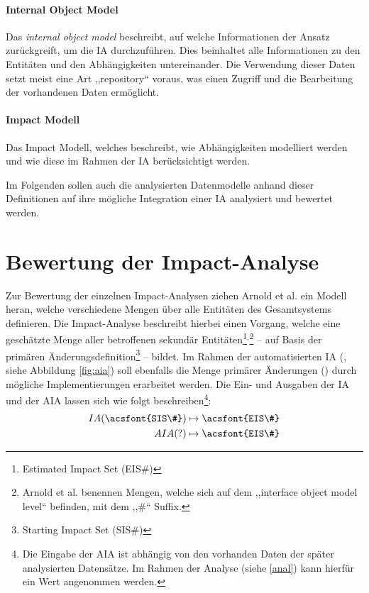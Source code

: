 \paragraph{Internal Object Model}
    Das \textit{internal object model} beschreibt, auf welche Informationen der Ansatz zurückgreift, um die \ac{IA} durchzuführen.
    Dies beinhaltet alle Informationen zu den Entitäten und den Abhängigkeiten untereinander.
    Die Verwendung dieser Daten setzt meist eine Art ,,repository`` voraus, was einen Zugriff und die Bearbeitung der vorhandenen Daten ermöglicht. \cite[295]{app_bohner}

\paragraph{Impact Modell}
    Das Impact Modell, welches beschreibt, wie Abhängigkeiten modelliert werden und wie diese im Rahmen der \ac{IA} berücksichtigt werden.

\bigskip
\noindent
Im Folgenden sollen auch die analysierten Datenmodelle anhand dieser Definitionen auf ihre mögliche Integration einer \ac{IA} analysiert und bewertet werden.

\pagebreak
\section{Bewertung der Impact-Analyse}

Zur Bewertung der einzelnen Impact-Analysen ziehen Arnold et al. ein Modell heran, welche verschiedene Mengen über alle Entitäten des Gesamtsystems definieren.
Die Impact-Analyse beschreibt hierbei einen Vorgang, welche eine geschätzte Menge aller betroffenen sekundär Entitäten\footnote{Estimated Impact Set (EIS\#)}$^,$\footnote{Arnold et al. benennen Mengen, welche sich auf dem ,,interface object model level`` befinden, mit dem ,,\#`` Suffix.} -- auf Basis der primären Änderungsdefinition\footnote{Starting Impact Set (SIS\#)} -- bildet.
Im Rahmen der automatisierten \ac{IA} (, siehe Abbildung \ref{fig:aia}) soll ebenfalls die Menge primärer Änderungen () durch mögliche Implementierungen erarbeitet werden.
Die Ein- und Ausgaben der \acf{IA} und der \acf{AIA} lassen sich wie folgt beschreiben\footnote{Die Eingabe der \ac{AIA} ist abhängig von den vorhanden Daten der später analysierten Datensätze. Im Rahmen der Analyse (siehe \ref{anal}) kann hierfür ein Wert angenommen werden.}:
\begin{align}
    IA(\text{\acsfont{SIS\#}}) &\mapsto \text{\acsfont{EIS\#}} \\
    AIA(?)                     &\mapsto \text{\acsfont{EIS\#}}
\end{align}

